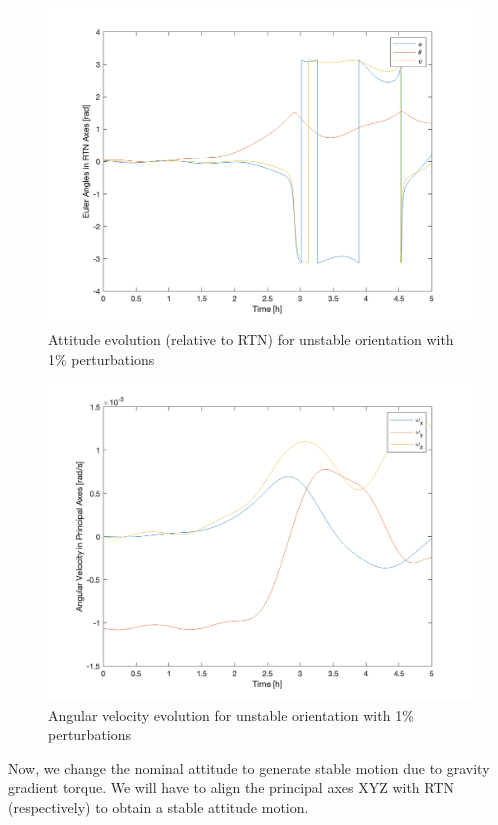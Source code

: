 \begin{figure}[H]
\centering
\includegraphics[scale=0.6]{Images/ps5_problem1b_angle_rtn.png}
\caption{Attitude evolution (relative to RTN) for unstable orientation with 1\% perturbations}
\label{fig:ps5_problem1b_angle_rtn}
\end{figure}

\begin{figure}[H]
\centering
\includegraphics[scale=0.6]{Images/ps5_problem1b_angvel.png}
\caption{Angular velocity evolution for unstable orientation with 1\% perturbations}
\label{fig:ps5_problem1b_angvel}
\end{figure}

Now, we change the nominal attitude to generate stable motion due to gravity gradient torque. We will have to align the principal axes XYZ with RTN (respectively) to obtain a stable attitude motion.

